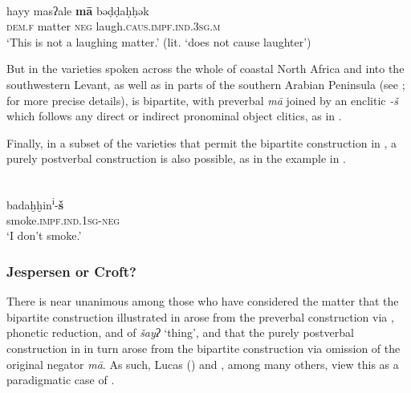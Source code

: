 \documentclass[output=paper]{langsci/langscibook}
\begin{document}
\ea\label{dam}
{         \citep[328]{Cowell1964}}\\
\gll hayy masʔale \textbf{mā} bəḍḍaḥḥək\\
     \textsc{dem.f} matter \textsc{neg} laugh.\textsc{caus.impf.ind.3sg.m}\\
\glt ‘This is not a laughing matter.’ (lit. ‘does not cause laughter’)
\z

But in the varieties spoken across the whole of coastal North Africa and into the southwestern Levant, as well as in parts of the southern Arabian Peninsula (see \citealt{Diem2014}; \citealt{Lucas2018} for more precise details),  is bipartite, with preverbal \textit{mā} joined by an enclitic \textit{-š} which follows any direct or indirect pronominal object clitics, as in .

Finally, in a subset of the varieties that permit the bipartite construction in , a purely postverbal construction is also possible, as in the   example in .

\ea\label{pal}

{         \citep[147]{Seeger2013grammar}}\\
\gll badaḫḫin\textsuperscript{i}-\textbf{š}\\
     smoke.\textsc{impf.ind.1sg-neg}\\
\glt ‘I don’t smoke.’
\z




\subsubsection{Jespersen or Croft?}\label{sec:jesp}



There is near unanimous  among those who have considered the matter that the bipartite construction illustrated in  arose from the preverbal construction via , phonetic reduction, and  of \textit{šayʔ} ‘thing’, and that the purely postverbal construction in  in turn arose from the bipartite construction via omission of the original negator \textit{mā}. As such, Lucas (\citeyear{Lucas2007,Lucas2009,Lucas2018}) and \citet{Diem2014}, among many others, view this as a paradigmatic case of .
\end{document}
